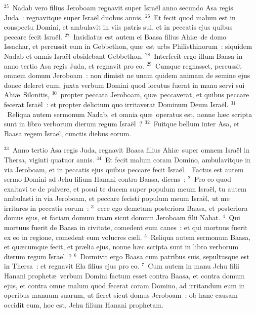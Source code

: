 ${}^{25}$~Nadab vero filius Jeroboam regnavit super Isra\"el anno secundo Asa regis Juda~: regnavitque super Isra\"el duobus annis.
${}^{26}$~Et fecit quod malum est in conspectu Domini, et ambulavit in viis patris sui, et in peccatis ejus quibus peccare fecit Isra\"el.
${}^{27}$~Insidiatus est autem ei Baasa filius Ahi\ae\ de domo Issachar, et percussit eum in Gebbethon, qu\ae\ est urbs Philisthinorum~: siquidem Nadab et omnis Isra\"el obsidebant Gebbethon.
${}^{28}$~Interfecit ergo illum Baasa in anno tertio Asa regis Juda, et regnavit pro eo.
${}^{29}$~Cumque regnasset, percussit omnem domum Jeroboam~: non dimisit ne unam quidem animam de semine ejus donec deleret eum, juxta verbum Domini quod locutus fuerat in manu servi sui Ahi\ae\ Silonitis,
${}^{30}$~propter peccata Jeroboam, qu\ae\ peccaverat, et quibus peccare fecerat Isra\"el~: et propter delictum quo irritaverat Dominum Deum Isra\"el.
${}^{31}$~Reliqua autem sermonum Nadab, et omnia qu\ae\ operatus est, nonne h\ae c scripta sunt in libro verborum dierum regum Isra\"el~?
${}^{32}$~Fuitque bellum inter Asa, et Baasa regem Isra\"el, cunctis diebus eorum.


${}^{33}$~Anno tertio Asa regis Juda, regnavit Baasa filius Ahi\ae\ super omnem Isra\"el in Thersa, viginti quatuor annis.
${}^{34}$~Et fecit malum coram Domino, ambulavitque in via Jeroboam, et in peccatis ejus quibus peccare fecit Isra\"el.
~Factus est autem sermo Domini ad Jehu filium Hanani contra Baasa, dicens~:
${}^{2}$~Pro eo quod exaltavi te de pulvere, et posui te ducem super populum meum Isra\"el, tu autem ambulasti in via Jeroboam, et peccare fecisti populum meum Isra\"el, ut me irritares in peccatis eorum~:
${}^{3}$~ecce ego demetam posteriora Baasa, et posteriora domus ejus, et faciam domum tuam sicut domum Jeroboam filii Nabat.
${}^{4}$~Qui mortuus fuerit de Baasa in civitate, comedent eum canes~: et qui mortuus fuerit ex eo in regione, comedent eum volucres c\ae li.
${}^{5}$~Reliqua autem sermonum Baasa, et qu\ae cumque fecit, et pr\ae lia ejus, nonne h\ae c scripta sunt in libro verborum dierum regum Isra\"el~?
${}^{6}$~Dormivit ergo Baasa cum patribus suis, sepultusque est in Thersa~: et regnavit Ela filius ejus pro eo.
${}^{7}$~Cum autem in manu Jehu filii Hanani prophet\ae\ verbum Domini factum esset contra Baasa, et contra domum ejus, et contra omne malum quod fecerat coram Domino, ad irritandum eum in operibus manuum suarum, ut fieret sicut domus Jeroboam~: ob hanc causam occidit eum, hoc est, Jehu filium Hanani prophetam.


